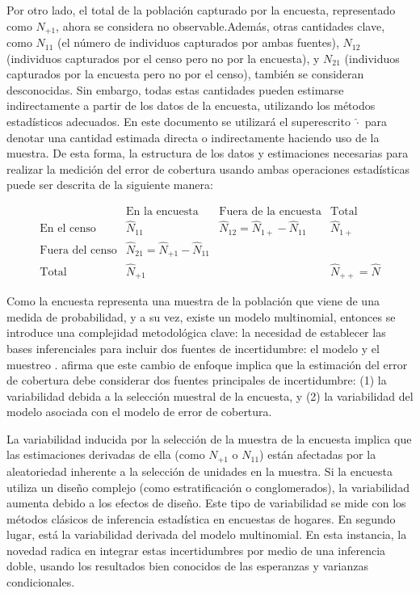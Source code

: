 \documentclass[
  12pt,
]{book}
\begin{document}
Por otro lado, el total de la población capturado por la encuesta, representado como \(N_{+1}\), ahora se considera no observable.Además, otras cantidades clave, como \(N_{11}\) (el número de individuos capturados por ambas fuentes), \(N_{12}\) (individuos capturados por el censo pero no por la encuesta), y \(N_{21}\) (individuos capturados por la encuesta pero no por el censo), también se consideran desconocidas. Sin embargo, todas estas cantidades pueden estimarse indirectamente a partir de los datos de la encuesta, utilizando los métodos estadísticos adecuados. En este documento se utilizará el superescrito \(\hat \cdot\) para denotar una cantidad estimada directa o indirectamente haciendo uso de la muestra. De esta forma, la estructura de los datos y estimaciones necesarias para realizar la medición del error de cobertura usando ambas operaciones estadísticas puede ser descrita de la siguiente manera:

\[
    \begin{array}{c|cc|c}
    & \text{En la encuesta} & \text{Fuera de la encuesta} & \text{Total} \\
    \hline
    \text{En el censo} & \hat{N}_{11} & \hat{N}_{12} = \hat{N}_{1+} - \hat{N}_{11} & \hat{N}_{1+} \\
    \text{Fuera del censo} & \hat{N}_{21} = \hat{N}_{+1} - \hat{N}_{11} &  &  \\
    \hline
    \text{Total} & \hat{N}_{+1} &  & \hat{N}_{++} = \hat{N}
    \end{array}
    \]

Como la encuesta representa una muestra de la población que viene de una medida de probabilidad, y a su vez, existe un modelo multinomial, entonces se introduce una complejidad metodológica clave: la necesidad de establecer las bases inferenciales para incluir dos fuentes de incertidumbre: el modelo y el muestreo \citep{Binder_2011}. \citet{wolter1986coverage} afirma que este cambio de enfoque implica que la estimación del error de cobertura debe considerar dos fuentes principales de incertidumbre: (1) la variabilidad debida a la selección muestral de la encuesta, y (2) la variabilidad del modelo asociada con el modelo de error de cobertura.

La variabilidad inducida por la selección de la muestra de la encuesta implica que las estimaciones derivadas de ella (como \(N_{+1}\) o \(N_{11}\)) están afectadas por la aleatoriedad inherente a la selección de unidades en la muestra. Si la encuesta utiliza un diseño complejo (como estratificación o conglomerados), la variabilidad aumenta debido a los efectos de diseño. Este tipo de variabilidad se mide con los métodos clásicos de inferencia estadística en encuestas de hogares. En segundo lugar, está la variabilidad derivada del modelo multinomial. En esta instancia, la novedad radica en integrar estas incertidumbres por medio de una inferencia doble, usando los resultados bien conocidos de las esperanzas y varianzas condicionales.
\end{document}
